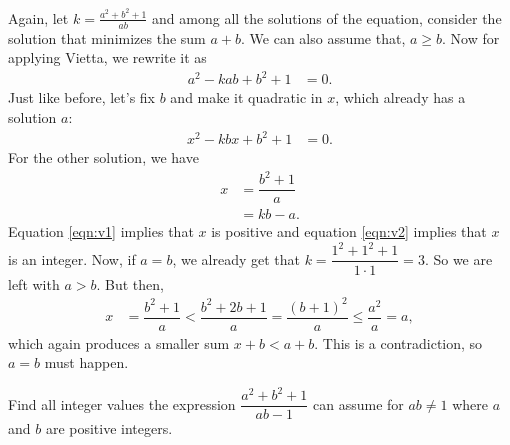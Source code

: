 \documentclass{subfile}
\begin{document}
	\begin{solution}
		Again, let $k=\frac{a^2+b^2+1}{ab}$ and among all the solutions of the equation, consider the solution that minimizes the sum $a+b$. We can also assume that, $a\geq b$. Now for applying Vietta, we rewrite it as
			\begin{align*}
				a^2-kab+b^2+1 & = 0.
			\end{align*}
		Just like before, let's fix $b$ and make it quadratic in $x$, which already has a solution $a$:
			\begin{align*}
				x^2-kbx+b^2+1 & = 0.
			\end{align*}
		For the other solution, we have
			\begin{align}
				x & = \dfrac{b^2+1}{a}\label{eqn:v1}\\
				  & = kb-a.\label{eqn:v2}
			\end{align}
		Equation \eqref{eqn:v1} implies that $x$ is positive and equation \eqref{eqn:v2} implies that $x$ is an integer. Now, if $a=b$, we already get that $k=\dfrac{1^2+1^2+1}{1\cdot1}=3$. So we are left with $a>b$. But then,
			\begin{align*}
				x & = \dfrac{b^2+1}{a}< \dfrac{b^2+2b+1}{a}= \dfrac{(b+1)^2}{a} \leq\dfrac{a^2}{a} = a,
			\end{align*}
		which again produces a smaller sum $x+b<a+b$. This is a contradiction, so $a=b$ must happen.
	\end{solution}

	\begin{problem}
		Find all integer values the expression $\dfrac{a^2+b^2+1}{ab-1}$ can assume for $ab\neq1$ where $a$ and $b$ are positive integers.
	\end{problem}
\end{document}

